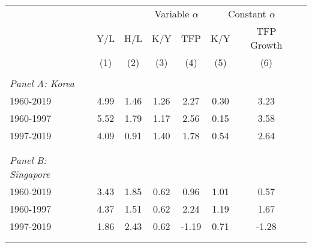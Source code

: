 \begin{tabular}{lccccccc}
\hline \hline
                    &\multicolumn{2}{c}{}     &\multicolumn{2}{c}{Variable $\alpha$}&\multicolumn{2}{c}{Constant $\alpha$}\\\cmidrule(lr){2-3}\cmidrule(lr){4-5}\cmidrule(lr){6-7}
                    &\multicolumn{1}{c}{Y/L}&\multicolumn{1}{c}{H/L}&\multicolumn{1}{c}{K/Y}&\multicolumn{1}{c}{TFP}&\multicolumn{1}{c}{K/Y}&\multicolumn{1}{c}{TFP Growth}\\
& (1) & (2) & (3) & (4) & (5) & (6) \\
\hline \\ 
\textit{Panel A: Korea} \\
1960-2019           &        4.99&        1.46&        1.26&        2.27&        0.30&        3.23\\
1960-1997           &        5.52&        1.79&        1.17&        2.56&        0.15&        3.58\\
1997-2019           &        4.09&        0.91&        1.40&        1.78&        0.54&        2.64\\
\\ 
\hline \\ 

\textit{Panel B: Singapore} \\
1960-2019           &        3.43&        1.85&        0.62&        0.96&        1.01&        0.57\\
1960-1997           &        4.37&        1.51&        0.62&        2.24&        1.19&        1.67\\
1997-2019           &        1.86&        2.43&        0.62&       -1.19&        0.71&       -1.28\\
\\ 
\hline \\ 
\end{tabular}
